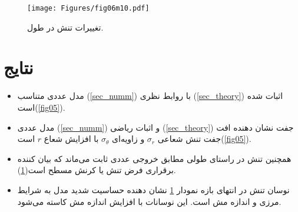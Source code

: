 \documentclass[11pt]{article} %
\newcommand\pcref[1]{(\cref{#1})}
\begin{document}
\begin{figure}\centering
%
\texttt{[image: Figures/fig06m10.pdf]}
\caption{تغییرات تنش در طول.}\label{fig06}
\end{figure}
\section{نتایج}
\begin{itemize} 
\item مدل عددی متناسب \pcref{sec_numm} با روابط نظری \pcref{sec_theory} اثبات شده است\pcref{fig05}.
\item مدل عددی \pcref{sec_numm} و اثبات ریاضی \pcref{sec_theory} جفت نشان دهنده افت جفت تنش شعاعی $\sigma_r$ و زاویه‌ای $\sigma_\theta$ با افزایش شعاع $r$ است\pcref{fig05}.
\item همچنین تنش در راستای طولی مطابق خروجی عددی ثابت می‌ماند که بیان کننده برقراری فرض تنش یا کرنش مسطح است\pcref{fig06}. 
\item نوسان تنش در انتهای بازه نمودار \cref{fig06} نشان دهنده حساسیت شدید مدل به شرایط مرزی و اندازه مش است. این نوسانات با افزایش اندازه مش کاسته می‌شود.
\end{itemize}
\newpage
\end{document}
